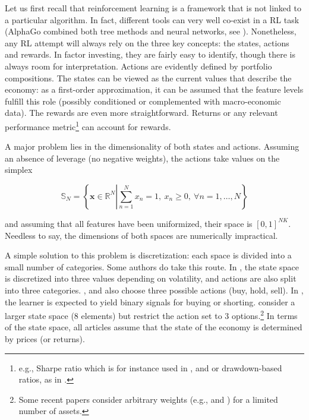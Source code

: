Let us first recall that reinforcement learning is a framework that is not linked to a particular algorithm. In fact, different tools can very well co-exist in a RL task (AlphaGo combined both tree methods and neural networks, see \cite{silver2016mastering}). Nonetheless, any RL attempt will always rely on the three key concepts: the states,  actions and rewards. In factor investing, they are fairly easy to identify, though there is always room for interpretation. Actions are evidently defined by portfolio compositions. The states can be viewed as the current values that describe the economy: as a first-order approximation, it can be assumed that the feature levels fulfill this role (possibly conditioned or complemented with macro-economic data). The rewards are even more straightforward. Returns or any relevant performance metric\footnote{e.g., Sharpe ratio which is for instance used in \cite{moody1998performance}, \cite{bertoluzzo2012testing} and \cite{aboussalah2020continuous} or drawdown-based ratios, as in \cite{almahdi2017adaptive}.} can account for rewards.

A major problem lies in the dimensionality of both states and actions. Assuming an absence of leverage (no negative weights), the actions take values on the simplex

\begin{equation}
\label{eq-simplex}
\mathbb{S}_N=\left\{ \mathbf{x} \in \mathbb{R}^N\left|\sum_{n=1}^Nx_n=1, \ x_n\ge 0, \ \forall n=1,\dots,N \right.\right\}
\end{equation}

and assuming that all features have been uniformized, their space is $[0,1]^{NK}$. Needless to say, the dimensions of both spaces are numerically impractical.

A simple solution to this problem is discretization: each space is divided into a small number of categories. Some authors do take this route. In \cite{yang2018investor}, the state space is discretized into three values depending on volatility, and actions are also split into three categories. \cite{bertoluzzo2012testing}, \cite{xiong2018practical} and \cite{taghian2020learning} also choose three possible actions (buy, hold, sell). In \cite{almahdi2019constrained}, the learner is expected to yield binary signals for buying or shorting. \cite{garcia2019continuous} consider a larger state space (8 elements) but restrict the action set to 3 options.\footnote{Some recent papers consider arbitrary weights (e.g., \cite{jiang2017deep} and \cite{yu2019model}) for a limited number of assets.} In terms of the state space, all articles assume that the state of the economy is determined by prices (or returns).

